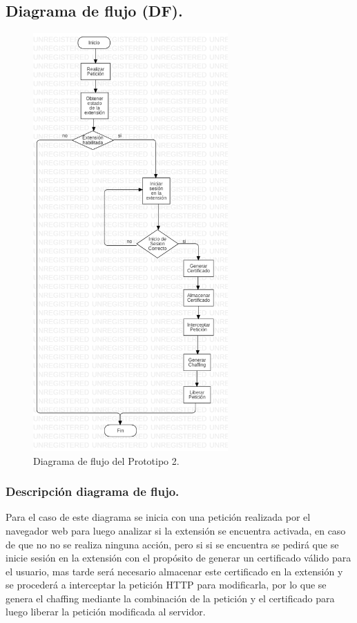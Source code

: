 \documentclass[12pt, a4paper, titlepage]{report}
\begin{document}
			\subsection{Diagrama de flujo (DF).}
			    \begin{figure}[H]
					\begin{center}			    	\includegraphics[height=16cm]{./imagenes/Desarrollo/Prototipo_2/DF_P2.png}
						\caption{Diagrama de flujo del Prototipo 2.}
					\end{center}
				\end{figure}
				
			    \subsubsection{Descripción diagrama de flujo.}
			        Para el caso de este diagrama se inicia con una petición realizada por el navegador web para luego analizar si la extensión se encuentra activada, en caso de que no no se realiza ninguna acción, pero si si se encuentra se pedirá que se inicie sesión en la extensión con el propósito de generar un certificado válido para el usuario, mas tarde será necesario almacenar este certificado en la extensión y se procederá a interceptar la petición HTTP para modificarla, por lo que se genera el chaffing mediante la combinación de la petición y el certificado para luego liberar la petición modificada al servidor.
				
\end{document}
